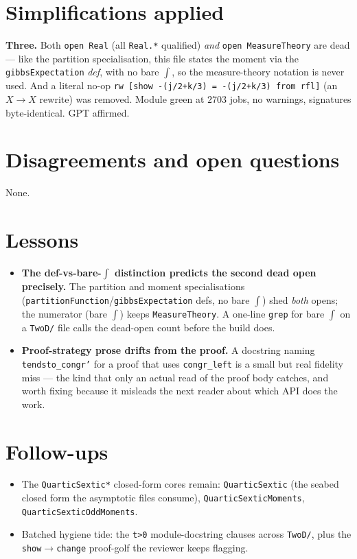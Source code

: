 \documentclass[11pt]{article}
\begin{document}
\section{Simplifications applied}
\textbf{Three.} Both \texttt{open Real} (all \texttt{Real.*} qualified) \emph{and}
\texttt{open MeasureTheory} are dead --- like the partition specialisation, this file states the
moment via the \texttt{gibbsExpectation} \emph{def}, with no bare $\int$, so the measure-theory
notation is never used. And a literal no-op
\texttt{rw [show -(j/2+k/3) = -(j/2+k/3) from rfl]} (an $X\to X$ rewrite) was removed. Module green
at $2703$ jobs, no warnings, signatures byte-identical. GPT affirmed.

\section{Disagreements and open questions}
None.

\section{Lessons}
\begin{itemize}[noitemsep]
  \item \textbf{The def-vs-bare-$\int$ distinction predicts the second dead open precisely.} The
    partition and moment specialisations (\texttt{partitionFunction}/\texttt{gibbsExpectation} defs,
    no bare $\int$) shed \emph{both} opens; the numerator (bare $\int$) keeps
    \texttt{MeasureTheory}. A one-line \texttt{grep} for bare $\int$ on a \texttt{TwoD/} file calls
    the dead-open count before the build does.
  \item \textbf{Proof-strategy prose drifts from the proof.} A docstring naming
    \texttt{tendsto\_congr'} for a proof that uses \texttt{congr\_left} is a small but real fidelity
    miss --- the kind that only an actual read of the proof body catches, and worth fixing because
    it misleads the next reader about which API does the work.
\end{itemize}

\section{Follow-ups}
\begin{itemize}[noitemsep]
  \item The \texttt{QuarticSextic*} closed-form cores remain: \texttt{QuarticSextic} (the seabed
    closed form the asymptotic files consume), \texttt{QuarticSexticMoments},
    \texttt{QuarticSexticOddMoments}.
  \item Batched hygiene tide: the \texttt{t>0} module-docstring clauses across \texttt{TwoD/}, plus
    the \texttt{show}$\to$\texttt{change} proof-golf the reviewer keeps flagging.
\end{itemize}
\end{document}
